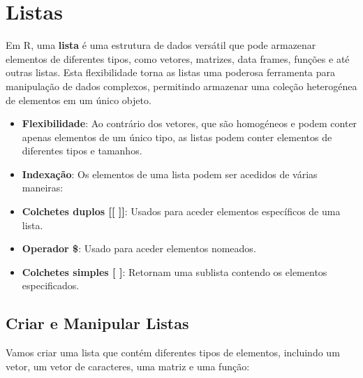 \documentclass[
]{book}
\providecommand{\tightlist}{%
  \setlength{\itemsep}{0pt}\setlength{\parskip}{0pt}}
\begin{document}
\section{Listas}\label{listas}

Em R, uma \textbf{lista} é uma estrutura de dados versátil que pode armazenar
elementos de diferentes tipos, como vetores, matrizes, data frames,
funções e até outras listas. Esta flexibilidade torna as listas uma
poderosa ferramenta para manipulação de dados complexos, permitindo
armazenar uma coleção heterogénea de elementos em um único objeto.

\begin{itemize}
\tightlist
\item
  \textbf{Flexibilidade}: Ao contrário dos vetores, que são homogéneos e
  podem conter apenas elementos de um único tipo, as listas podem
  conter elementos de diferentes tipos e tamanhos.
\item
  \textbf{Indexação}: Os elementos de uma lista podem ser acedidos de
  várias maneiras:
\item
  \textbf{Colchetes duplos {[}{[} {]}{]}}: Usados para aceder elementos específicos
  de uma lista.
\item
  \textbf{Operador \$}: Usado para aceder elementos nomeados.
\item
  \textbf{Colchetes simples {[} {]}}: Retornam uma sublista contendo os
  elementos especificados.
\end{itemize}

\subsection{Criar e Manipular Listas}\label{criar-e-manipular-listas}

Vamos criar uma lista que contém diferentes tipos de elementos,
incluindo um vetor, um vetor de caracteres, uma matriz e uma função:
\end{document}
